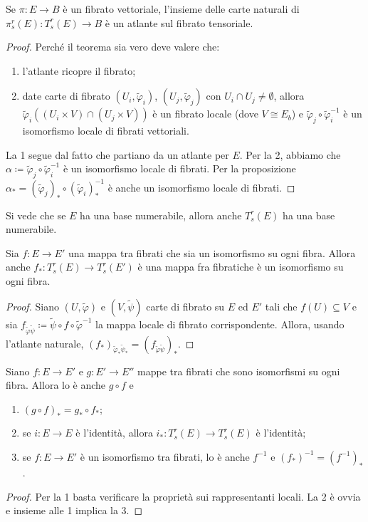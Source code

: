 \begin{theorem}
	Se $\pi: E \to B$ è un fibrato vettoriale, l'insieme delle carte naturali di $\pi_s^r(E):T_s^r(E) \to B$ è un atlante sul fibrato tensoriale.
\end{theorem}
\begin{proof}
	Perché il teorema sia vero deve valere che:
	\begin{enumerate}
		\item l'atlante ricopre il fibrato;
		\item date carte di fibrato $(U_i,\tilde\varphi_i)$, $(U_j,\tilde\varphi_j)$ con $U_i\cap U_j\not=\emptyset$, allora $\tilde\varphi_i( (U_i\times V) \cap (U_j\times V) )$ è un fibrato locale (dove $V\cong E_b$) e $\tilde\varphi_j\circ \tilde\varphi_i^{-1}$ è un isomorfismo locale di fibrati vettoriali.
	\end{enumerate}
	La 1 segue dal fatto che partiano da un atlante per $E$.
	Per la 2, abbiamo che $\alpha \coloneqq \tilde\varphi_j\circ \tilde\varphi_i^{-1}$ è un isomorfismo locale di fibrati. Per la proposizione $\alpha_* = (\tilde\varphi_j)_*\circ (\tilde\varphi_i)_*^{-1}$ è anche un isomorfismo locale di fibrati. %
\end{proof}

\begin{remark}
	Si vede che se $E$ ha una base numerabile, allora anche $T_s^r(E)$ ha una base numerabile. 
\end{remark}

\begin{proposition}
	Sia $f:E\to E'$ una mappa tra fibrati che sia un isomorfismo su ogni fibra. Allora anche $f_*:T_s^r(E) \to T_s^r(E')$ è una mappa fra fibratiche è un isomorfismo su ogni fibra.
\end{proposition}
\begin{proof}
	Siano $(U,\tilde\varphi)$ e $(V,\tilde\psi)$ carte di fibrato su $E$ ed $E'$ tali che $f(U) \subseteq V$ e sia $f_{\tilde\varphi\tilde\psi} \coloneqq \tilde\psi \circ f \circ \tilde\varphi^{-1}$ la mappa locale di fibrato corrispondente. Allora, usando l'atlante naturale, $(f_*)_{\tilde\varphi_*\tilde\psi_*} = (f_{\tilde\varphi\tilde\psi})_*$.
\end{proof}

\begin{proposition}
	Siano $f:E\to E'$ e $g:E' \to E''$ mappe tra fibrati che sono isomorfismi su ogni fibra. Allora lo è anche $g \circ f$ e
	\begin{enumerate}
		\item $(g\circ f)_* = g_* \circ f_*$;
		\item se $i:E \to E$ è l'identità, allora $i_* : T_s^r(E) \to T_s^r(E)$ è l'identità;
		\item se $f:E \to E'$ è un isomorfismo tra fibrati, lo è anche $f^{-1}$ e $(f_*)^{-1} = (f^{-1})_*$.
	\end{enumerate}
\end{proposition}
\begin{proof} %
	Per la 1 basta verificare la proprietà sui rappresentanti locali. La 2 è ovvia e insieme alle 1 implica la 3.
\end{proof}

